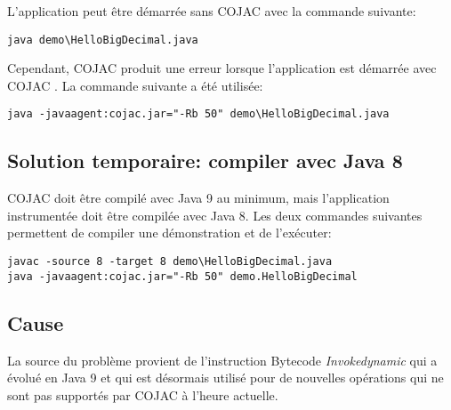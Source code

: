 L'application peut être démarrée sans COJAC \cite{COJAC} avec la commande suivante:
\begin{verbatim}
java demo\HelloBigDecimal.java
\end{verbatim}

Cependant, COJAC \cite{COJAC} produit une erreur lorsque l'application est démarrée avec COJAC \cite{COJAC}. La commande suivante a été utilisée:
\begin{verbatim}
java -javaagent:cojac.jar="-Rb 50" demo\HelloBigDecimal.java
\end{verbatim}

\subsection{Solution temporaire: compiler avec Java 8}

COJAC \cite{COJAC} doit être compilé avec Java 9 au minimum, mais l'application instrumentée doit être compilée avec Java 8. Les deux commandes suivantes permettent de compiler une démonstration et de l'exécuter:
\begin{verbatim}
javac -source 8 -target 8 demo\HelloBigDecimal.java
java -javaagent:cojac.jar="-Rb 50" demo.HelloBigDecimal
\end{verbatim}

\subsection{Cause}

La source du problème provient de l'instruction Bytecode \textit{Invokedynamic} qui a évolué en Java 9 et qui est désormais utilisé pour de nouvelles opérations qui ne sont pas supportés par COJAC \cite{COJAC} à l'heure actuelle.
